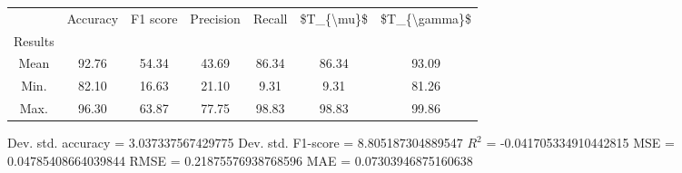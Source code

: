 \begin{tabular}{|c|c|c|c|c|c|c|}
\toprule
{} &  Accuracy &  F1 score &  Precision &  Recall &  \$T\_\{\textbackslash mu\}\$ &  \$T\_\{\textbackslash gamma\}\$ \\
Results &           &           &            &         &            &               \\
\hline
Mean    &     92.76 &     54.34 &      43.69 &   86.34 &      86.34 &         93.09 \\
Min.    &     82.10 &     16.63 &      21.10 &    9.31 &       9.31 &         81.26 \\
Max.    &     96.30 &     63.87 &      77.75 &   98.83 &      98.83 &         99.86 \\
\bottomrule
\end{tabular}

 Dev. std. accuracy = 3.037337567429775
 Dev. std. F1-score = 8.805187304889547
 $R^2$ = -0.041705334910442815
 MSE = 0.04785408664039844
 RMSE = 0.21875576938768596
 MAE = 0.07303946875160638